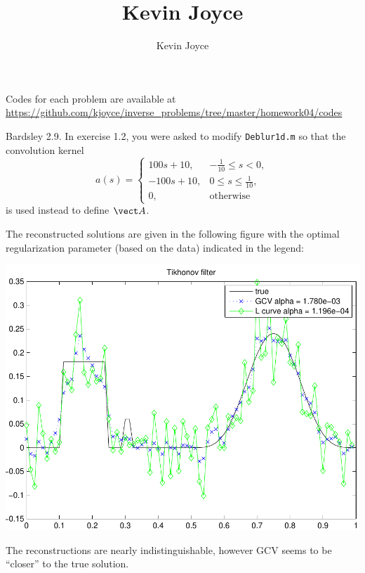 \documentclass{homework}
\title{Kevin Joyce}
\author{Kevin Joyce}
\begin{document}
 
\newcommand{\figref}[1]{\figurename~\ref{#1}}
\renewcommand{\bar}{\overline}
\renewcommand{\hat}{\widehat}
\renewcommand{\SS}{\mathcal S}
\newcommand{\HH}{\mathscr H}
\newcommand{\mom}{\widetilde}
\newcommand{\mle}{\widehat \Uptheta}
\newcommand{\eps}{\varepsilon}
\newcommand{\todist}{\stackrel{D}\longrightarrow}
\newcommand{\toprob}{\stackrel{p}\longrightarrow}
\newcommand{\TTheta}{\overline{\underline \Theta} }
\newcommand{\del}{\partial}
\newcommand{\approxsim}{\overset{\cdotp}{\underset{\cdotp}{\sim}}}

Codes for each problem are available at \url{https://github.com/kjoyce/inverse_problems/tree/master/homework04/codes}

\begin{longproblem} 
Bardsley 2.9. In exercise 1.2, you were asked to modify \texttt{Deblur1d.m} so that the convolution kernel
$$
  a(s) = \begin{cases}
  100s + 10,  &-\frac 1{10} \le s < 0,\\
  -100s + 10, &0\le s \le \frac 1{10},\\
  0,	      &\text{otherwise}
  \end{cases}
$$
is used instead to define $\vect A$.

\begin{solution} 
The reconstructed solutions are given in the following figure with the optimal regularization parameter (based on the data) indicated in the legend:
\begin{center}
\includegraphics[width=.4\textwidth]{29a_reconstruction.pdf}
\end{center}
The reconstructions are nearly indistinguishable, however GCV seems to be ``closer'' to the true solution. 
\end{solution}


\end{longproblem}
\end{document}
